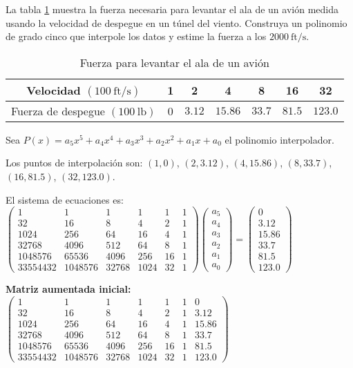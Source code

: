 \begin{prob}
La tabla \ref{Aladeaviontabla} muestra la fuerza necesaria para levantar el ala de un avión medida usando la velocidad de despegue en un túnel del viento. Construya un polinomio de grado cinco que interpole los datos y estime la fuerza a los $2000\ \text{ft}/\text{s}.$

\begin{table}[H]
\centering
\begin{tabular}{|c|c|c|c|c|c|c|}\hline
Velocidad $(100\ \text{ft}/\text{s})$&1&2&4&8&16&32\\\hline
Fuerza de despegue $(100\ \text{lb})$&0&$3.12$&$15.86$&$33.7$&$81.5$&$123.0$\\\hline
\end{tabular}
\caption{Fuerza para levantar el ala de un avión}\label{Aladeaviontabla}
\end{table}

\begin{myproof}
Sea $P(x) = a_5x^5 + a_4x^4 + a_3x^3 + a_2x^2 + a_1x + a_0$ el polinomio interpolador.

Los puntos de interpolación son: $(1,0)$, $(2,3.12)$, $(4,15.86)$, $(8,33.7)$, $(16,81.5)$, $(32,123.0)$.

El sistema de ecuaciones es:
$\begin{pmatrix}
1 & 1 & 1 & 1 & 1 & 1 \\
32 & 16 & 8 & 4 & 2 & 1 \\
1024 & 256 & 64 & 16 & 4 & 1 \\
32768 & 4096 & 512 & 64 & 8 & 1 \\
1048576 & 65536 & 4096 & 256 & 16 & 1 \\
33554432 & 1048576 & 32768 & 1024 & 32 & 1
\end{pmatrix}
\begin{pmatrix}
a_5 \\ a_4 \\ a_3 \\ a_2 \\ a_1 \\ a_0
\end{pmatrix} = 
\begin{pmatrix}
0 \\ 3.12 \\ 15.86 \\ 33.7 \\ 81.5 \\ 123.0
\end{pmatrix}$

\textbf{Matriz aumentada inicial:}
$\left(\begin{array}{cccccc|c}
1 & 1 & 1 & 1 & 1 & 1 & 0 \\
32 & 16 & 8 & 4 & 2 & 1 & 3.12 \\
1024 & 256 & 64 & 16 & 4 & 1 & 15.86 \\
32768 & 4096 & 512 & 64 & 8 & 1 & 33.7 \\
1048576 & 65536 & 4096 & 256 & 16 & 1 & 81.5 \\
33554432 & 1048576 & 32768 & 1024 & 32 & 1 & 123.0
\end{array}\right)$


\end{myproof}
\end{prob}
